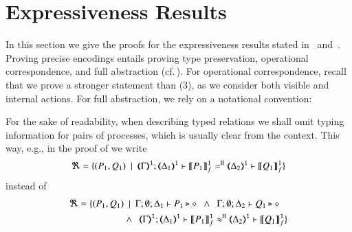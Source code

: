 \section{Expressiveness Results}
\label{app:proofs}

\noi
In this section we give the proofs for the expressiveness
results stated in~ and~.
Proving precise encodings entails proving type preservation, operational correspondence, and 
full abstraction (cf.\,). For operational correspondence, 
recall that we prove a stronger statement than (3),
		as we %
		consider both visible and internal actions.
For full abstraction, we rely on a notational convention:

\begin{notation}
For the sake of readability, when describing typed relations we shall omit typing information for pairs of processes, which is usually clear from the context. This way, e.g., in the proof of
  we write
	\[
		\Re = \set{(P_1, Q_1) \setbar \horel{\tmap{\Gamma}{1}}{\tmap{\Delta_1}{1}}{\pmapp{P_1}{1}{f}}{\hwb}{\tmap{\Delta_2}{1}}{\pmapp{Q_1}{1}{f}}}
	\]
	instead of 
		\begin{align*}
		\Re = \set{(P_1, Q_1) & \setbar 
		\Gamma; \emptyset; \Delta_1 \proves P_1 \hastype \Proc
		~~\land~~ 
		\Gamma; \emptyset; \Delta_2 \proves Q_1 \hastype \Proc
		 \\ & \land~~
		\horel{\tmap{\Gamma}{1}}{\tmap{\Delta_1}{1}}{\pmapp{P_1}{1}{f}}{\hwb}{\tmap{\Delta_2}{1}}{\pmapp{Q_1}{1}{f}}}
	\end{align*}
	\end{notation}


